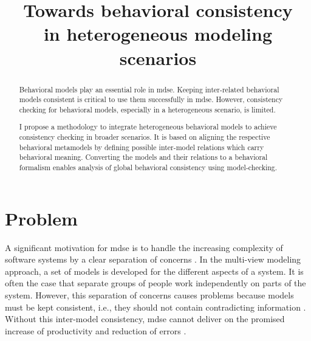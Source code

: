 \documentclass[conference]{IEEEtran}
\begin{document}
\title{Towards behavioral consistency \\ in heterogeneous modeling scenarios}

\author{
}


\maketitle

\begin{abstract}
Behavioral models play an essential role in \gls{mdse}.
Keeping inter-related behavioral models consistent is critical to use them successfully in \gls{mdse}. 
However, consistency checking for behavioral models, especially in a heterogeneous scenario, is limited.

I propose a methodology to integrate heterogeneous behavioral models to achieve consistency checking in broader scenarios.
It is based on aligning the respective behavioral metamodels by defining possible inter-model relations which carry behavioral meaning.
Converting the models and their relations to a behavioral formalism enables analysis of global behavioral consistency using model-checking. 
\end{abstract}


\IEEEpeerreviewmaketitle



\section{Problem}
A significant motivation for \gls{mdse} is to handle the increasing complexity of software systems by a clear separation of concerns \cite{franceModeldrivenDevelopmentComplex2007}.
In the multi-view modeling approach, a set of models is developed for the different aspects of a system.
It is often the case that separate groups of people work independently on parts of the system.
However, this separation of concerns causes problems because models must be kept consistent, i.e., they should not contain contradicting information \cite{cicchettiMultiviewApproachesSoftware2019}.
Without this inter-model consistency, \gls{mdse} cannot deliver on the promised increase of productivity and reduction of errors \cite{brambillaModeldrivenSoftwareEngineering2017}.
\end{document}

